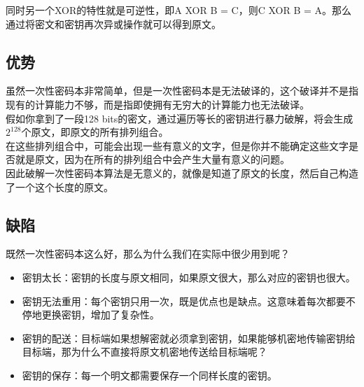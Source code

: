 同时另一个XOR的特性就是可逆性，即A XOR B = C，则C XOR B = A。那么通过将密文和密钥再次异或操作就可以得到原文。\\

\subsection{优势}

虽然一次性密码本非常简单，但是一次性密码本是无法破译的，这个破译并不是指现有的计算能力不够，而是指即使拥有无穷大的计算能力也无法破译。\\

假如你拿到了一段128 bits的密文，通过遍历等长的密钥进行暴力破解，将会生成$ 2^{128} $个原文，即原文的所有排列组合。\\

在这些排列组合中，可能会出现一些有意义的文字，但是你并不能确定这些文字是否就是原文，因为在所有的排列组合中会产生大量有意义的问题。\\

因此破解一次性密码本算法是无意义的，就像是知道了原文的长度，然后自己构造了一个这个长度的原文。\\

\subsection{缺陷}

既然一次性密码本这么好，那么为什么我们在实际中很少用到呢？

\begin{itemize}
    \item 密钥太长：密钥的长度与原文相同，如果原文很大，那么对应的密钥也很大。

    \item 密钥无法重用：每个密钥只用一次，既是优点也是缺点。这意味着每次都要不停地更换密钥，增加了复杂性。

    \item 密钥的配送：目标端如果想解密就必须拿到密钥，如果能够机密地传输密钥给目标端，那为什么不直接将原文机密地传送给目标端呢？

    \item 密钥的保存：每一个明文都需要保存一个同样长度的密钥。
\end{itemize}

\newpage